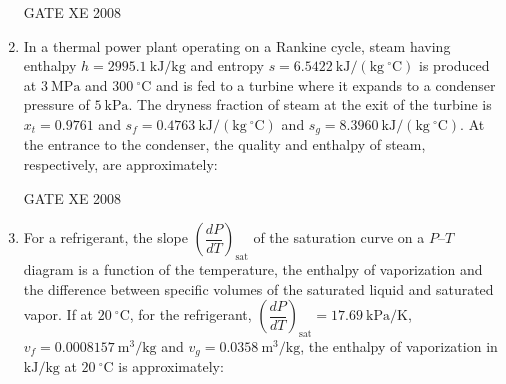 \documentclass[12pt]{article}
\begin{document}
\begin{enumerate}
\begin{enumerate}
\end{enumerate}

GATE XE 2008

\item In a thermal power plant operating on a Rankine cycle, steam having enthalpy $h = 2995.1\ \mathrm{kJ/kg}$ and entropy $s = 6.5422\ \mathrm{kJ/(kg\ ^\circ C)}$ is produced at $3\ \mathrm{MPa}$ and $300\ ^\circ \mathrm{C}$ and is fed to a turbine where it expands to a condenser pressure of $5\ \mathrm{kPa}$. The dryness fraction of steam at the exit of the turbine is $x_t = 0.9761$ and $s_f = 0.4763\ \mathrm{kJ/(kg\ ^\circ C)}$ and $s_g = 8.3960\ \mathrm{kJ/(kg\ ^\circ C)}$. At the entrance to the condenser, the quality and enthalpy of steam, respectively, are approximately:  

\begin{enumerate}
\end{enumerate}

GATE XE 2008

\item For a refrigerant, the slope $\left( \dfrac{dP}{dT} \right)_{\mathrm{sat}}$ of the saturation curve on a $P$–$T$ diagram is a function of the temperature, the enthalpy of vaporization and the difference between specific volumes of the saturated liquid and saturated vapor. If at $20\ ^\circ\mathrm{C}$, for the refrigerant, $\left( \dfrac{dP}{dT} \right)_{\mathrm{sat}} = 17.69\ \mathrm{kPa/K}$, $v_f = 0.0008157\ \mathrm{m^3/kg}$ and $v_g = 0.0358\ \mathrm{m^3/kg}$, the enthalpy of vaporization in $\mathrm{kJ/kg}$ at $20\ ^\circ\mathrm{C}$ is approximately:  

\begin{enumerate}
\end{enumerate}


\end{enumerate}
\end{document}
